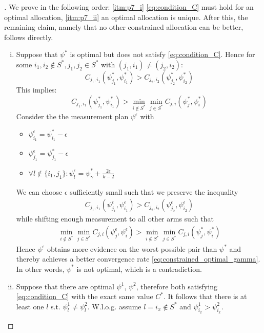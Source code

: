 \begin{proof}[]
  We prove in the following order: \eqref{itm:p7_i} \eqref{eq:condition_C} must hold for an optimal allocation, \eqref{itm:p7_ii} an optimal allocation is unique. After this, the remaining claim, namely that no other constrained allocation can be better, follows directly.
  \begin{enumerate}[(i)]
    \item \label{itm:p7_i} Suppose that $\psi^*$ is optimal but does not satisfy \eqref{eq:condition_C}. Hence for some $i_1, i_2 \notin S^*, j_1, j_2 \in S^*$ with $(j_1, i_1) \neq (j_2, i_2)$:
    \[C_{j_1, i_1}(\psi^*_{j_1}, \psi^*_{i_1}) > C_{j_2, i_2}(\psi^*_{j_2}, \psi^*_{i_2})\]
    This implies:
    \[C_{j_1, i_1}(\psi^*_{j_1}, \psi^*_{i_1}) > \min_{i \notin S^*} \min_{j \in S^*}C_{j, i}(\psi^*_j, \psi^*_i) \]
    Consider the the measurement plan $\psi^\epsilon$ with
    \begin{itemize}
      \item $\psi^\epsilon_{i_1} = \psi^*_{i_1} - \epsilon$
      \item $\psi^\epsilon_{j_1} = \psi^*_{j_1} - \epsilon$
      \item $\forall l\notin \{i_1, j_1\}: \psi^\epsilon_l = \psi^*_\gamma + \frac{2 \epsilon}{k-2}$
    \end{itemize}
    We can choose $\epsilon$ sufficiently small such that we preserve the inequality
    \begin{align}
      C_{j_1, i_1}(\psi^\epsilon_{j_1}, \psi^\epsilon_{i_1}) > C_{j_2, i_2}(\psi^\epsilon_{j_2}, \psi^\epsilon_{i_2})
    \end{align}
    while shifting enough measurement to all other arms such that
    \begin{align}
      \min_{i \notin S^*} \min_{j \in S^*} C_{j, i}(\psi^\epsilon_{j}, \psi^\epsilon_i) > \min_{i \notin S^*} \min_{j \in S^*} C_{j, i}(\psi^*_j, \psi^*_i)
    \end{align}
    Hence $\psi^\epsilon$ obtains more evidence on the worst possible pair than $\psi^*$ and thereby achieves a better convergence rate \eqref{eq:constrained_optimal_gamma}. In other words, $\psi^*$ is not optimal, which is a contradiction.

    \item \label{itm:p7_ii} Suppose that there are optimal $\psi^1$, $\psi^2$, therefore both satisfying \eqref{eq:condition_C} with the exact same value $C^*$. It follows that there is at least one $l$ s.t. $\psi^1_{l} \neq \psi^2_{l}$. W.l.o.g. assume $l = i_x \notin S^*$ and $\psi^1_{i_x} > \psi^2_{i_x}$.


\end{enumerate}
\end{proof}
